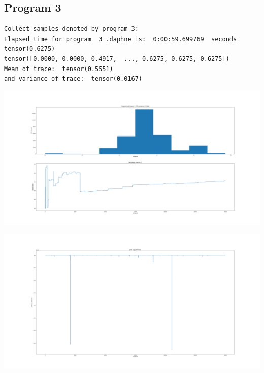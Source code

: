 \documentclass[]{article}
\begin{document}
\subsection{Program 3}
\begin{verbatim}
Collect samples denoted by program 3:
Elapsed time for program  3 .daphne is:  0:00:59.699769  seconds
tensor(0.6275)
tensor([0.0000, 0.0000, 0.4917,  ..., 0.6275, 0.6275, 0.6275])
Mean of trace:  tensor(0.5551)  
and variance of trace:  tensor(0.0167)
\end{verbatim}
\begin{center}
	\includegraphics[width=\linewidth]{Figures/p3_IS.png}
\end{center}
\begin{center}
	\includegraphics[width=\linewidth]{Figures/p3_ISjll.png}
\end{center}
\end{document}
